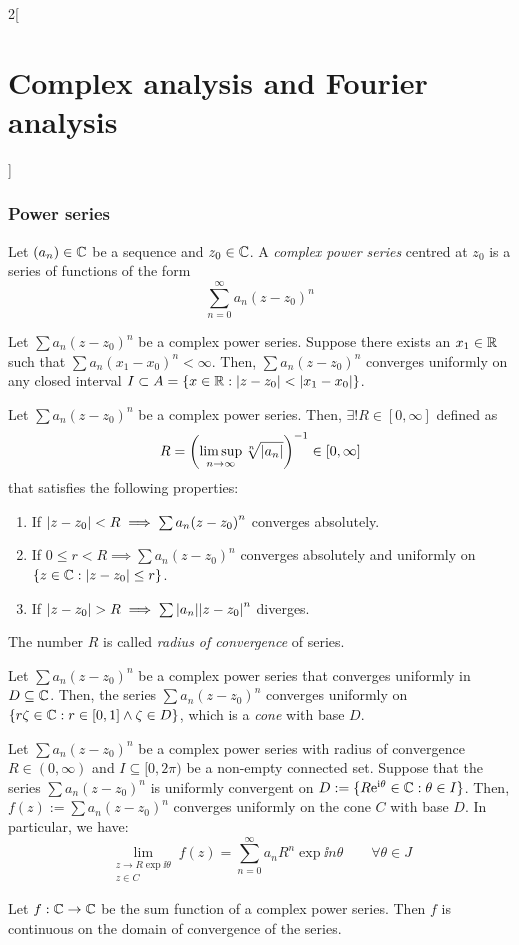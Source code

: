 \documentclass[../../../main.tex]{subfiles}
\begin{document}
\begin{multicols}{2}[\section{Complex analysis and Fourier analysis}]
  \subsubsection{Power series}
  \begin{definition}
    Let $(a_n)\in\mathbb{C}$ be a sequence and $z_0\in\mathbb{C}$. A \emph{complex power series} centred at $z_0$ is a series of functions of the form $$\sum_{n=0}^\infty a_n{(z-z_0)}^n$$
  \end{definition}
  \begin{proposition}
    Let $\sum a_n{(z-z_0)}^n$ be a complex power series. Suppose there exists an $x_1\in\mathbb{R} $ such that $\sum a_n(x_1-x_0)^n<\infty$. Then, $\sum a_n{(z-z_0)}^n$ converges uniformly on any closed interval $I\subset A=\{x\in\mathbb{R} :\abs{z-z_0}<\abs{x_1-x_0}\}$.
  \end{proposition}
  \begin{theorem}
    Let $\sum a_n{(z-z_0)}^n$ be a complex power series. Then, $\exists! R\in[0,\infty]$ defined as $$R=\left(\limsup_{n\to\infty}\sqrt[n]{\abs{a_n}}\right)^{-1}\in[0,\infty]$$
    that satisfies the following properties:
    \begin{enumerate}
      \item If $\abs{z-z_0}<R\implies\sum a_n{(z-z_0)}^n$ converges absolutely.
      \item If $0\leq r<R\implies\sum a_n{(z-z_0)}^n$ converges absolutely and uniformly on $\{z\in\mathbb{C}:\abs{z-z_0}\leq r\}$.
      \item If $\abs{z-z_0}>R\implies\sum\abs{a_n}{\abs{z-z_0}}^n$ diverges.
    \end{enumerate}
    The number $R$ is called \emph{radius of convergence} of series.
  \end{theorem}
  \begin{theorem}
    Let $\sum a_n{(z-z_0)}^n$ be a complex power series that converges uniformly in $D\subseteq \mathbb{C}$. Then, the series $\sum a_n{(z-z_0)}^n$ converges uniformly on $\{r\zeta\in\mathbb{C}:r\in[0,1]\land\zeta\in D\}$, which is a \emph{cone} with base $D$.
  \end{theorem}
  \begin{corollary}
    Let $\sum a_n{(z-z_0)}^n$ be a complex power series with radius of convergence $R\in(0,\infty)$ and $I\subseteq [0,2\pi)$ be a non-empty connected set. Suppose that the series $\sum a_n{(z-z_0)}^n$ is uniformly convergent on $D:=\{R\mathrm{e}^{\mathrm{i} \theta}\in\mathbb{C}: \theta\in I\}$. Then, $f(z):=\sum a_n{(z-z_0)}^n$ converges uniformly on the cone $C$ with base $D$. In particular, we have: $$\lim_{\substack{z\to R\exp{\ii \theta}\\z\in C}}f(z)=\sum_{n=0}^\infty a_nR^n\exp{\ii n\theta}\qquad\forall\theta\in J$$
  \end{corollary}
  \begin{proposition}
    Let $f:\mathbb{C}\rightarrow\mathbb{C}$ be the sum function of a complex power series. Then $f$ is continuous on the domain of convergence of the series.
  \end{proposition}

\end{multicols}
\end{document}
